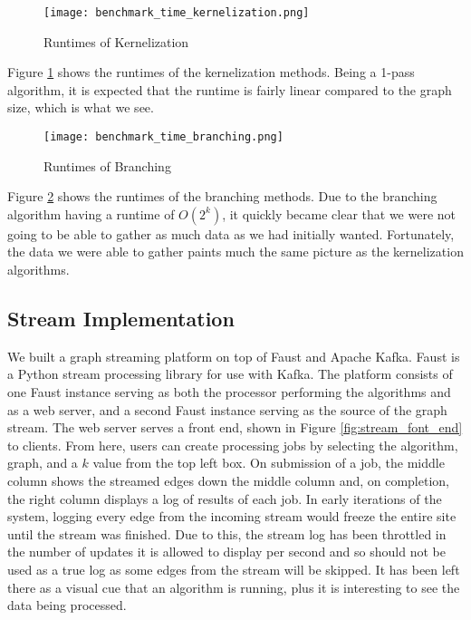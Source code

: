 \begin{figure}[htb]
    \centering
    \texttt{[image: benchmark\_time\_kernelization.png]}
    \caption{Runtimes of Kernelization}
    \label{fig:benchmark_time_kernelization}
\end{figure}

Figure \ref{fig:benchmark_time_kernelization} shows the runtimes of the
kernelization methods. Being a 1-pass algorithm, it is expected that the
runtime is fairly linear compared to the graph size, which is what we see.

\begin{figure}[htb]
    \centering
    \texttt{[image: benchmark\_time\_branching.png]}
    \caption{Runtimes of Branching}
    \label{fig:benchmark_time_branching}
\end{figure}

Figure \ref{fig:benchmark_time_branching} shows the runtimes of the branching
methods. Due to the branching algorithm having a runtime of \(O(2^k)\), it
quickly became clear that we were not going to be able to gather as much data as
we had initially wanted. Fortunately, the data we were able to gather paints
much the same picture as the kernelization algorithms.

\subsection{Stream Implementation}

We built a graph streaming platform on top of Faust and Apache Kafka. Faust is
a Python stream processing library for use with Kafka. The platform consists of
one Faust instance serving as both the processor performing the algorithms and
as a web server, and a second Faust instance serving as the source of the graph
stream. The web server serves a front end, shown in Figure
\ref{fig:stream_font_end} to clients. From here, users can create processing
jobs by selecting the algorithm, graph, and a \(k\) value from the top left
box. On submission of a job, the middle column shows the streamed edges down
the middle column and, on completion, the right column displays a log of
results of each job. In early iterations of the system, logging every edge from
the incoming stream would freeze the entire site until the stream was finished.
Due to this, the stream log has been throttled in the number of updates it is
allowed to display per second and so should not be used as a true log as some
edges from the stream will be skipped. It has been left there as a visual cue
that an algorithm is running, plus it is interesting to see the data being
processed.

